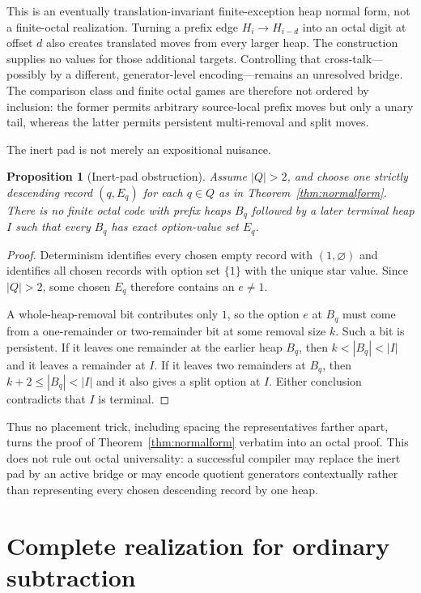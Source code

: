\documentclass[11pt]{article}
\newtheorem{proposition}[theorem]{Proposition}
\theoremstyle{definition}
\theoremstyle{remark}
\begin{document}
This is an eventually translation-invariant finite-exception heap normal
form, not a finite-octal realization.  Turning a prefix edge
$H_i\to H_{i-d}$ into an octal digit at offset $d$ also creates translated
moves from every larger heap.  The construction supplies no values for those
additional targets.  Controlling that cross-talk---possibly by a different,
generator-level encoding---remains an unresolved bridge.  The comparison
class and finite octal games are therefore not ordered by inclusion: the
former permits arbitrary source-local prefix moves but only a unary tail,
whereas the latter permits persistent multi-removal and split moves.

The inert pad is not merely an expositional nuisance.

\begin{proposition}[Inert-pad obstruction]\label{prop:pad-obstruction}
Assume $|Q|>2$, and choose one strictly descending record $(q,E_q)$ for each
$q\in Q$ as in Theorem~\ref{thm:normalform}.  There is no finite octal code
with prefix heaps $B_q$ followed by a later terminal heap $I$ such that every
$B_q$ has exact option-value set $E_q$.
\end{proposition}

\begin{proof}
Determinism identifies every chosen empty record with
$(1,\varnothing)$ and identifies all chosen records with option set $\{1\}$
with the unique star value.  Since $|Q|>2$, some chosen $E_q$ therefore
contains an $e\ne1$.

A whole-heap-removal bit contributes only $1$, so the option $e$ at $B_q$
must come from a one-remainder or two-remainder bit at some removal size $k$.
Such a bit is persistent.  If it leaves one remainder at the earlier heap
$B_q$, then $k<|B_q|<|I|$ and it leaves a remainder at $I$.  If it leaves two
remainders at $B_q$, then $k+2\le |B_q|<|I|$ and it also gives a split option
at $I$.  Either conclusion contradicts that $I$ is terminal.
\end{proof}

Thus no placement trick, including spacing the representatives farther
apart, turns the proof of Theorem~\ref{thm:normalform} verbatim into an octal
proof.  This does not rule out octal universality: a successful compiler may
replace the inert pad by an active bridge or may encode quotient generators
contextually rather than representing every chosen descending record by one
heap.

\section{Complete realization for ordinary subtraction}\label{sec:tame}
\end{document}
